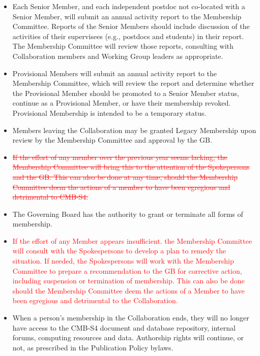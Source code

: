 \documentclass[12pt]{article}
\begin{document}
\begin{itemize} 

\item Each Senior Member, and each independent postdoc not co-located with a Senior Member, will submit an annual activity report to the Membership Committee.  Reports of the Senior Members should include discussion of the activities of their supervisees (e.g., postdocs and students) in their report. The Membership Committee will review those reports, consulting with Collaboration members and Working Group leaders as appropriate.

\item Provisional Members will submit an annual activity report to the Membership Committee, which will review the report and determine whether the Provisional Member should be promoted to a Senior Member status, continue as a Provisional Member, or have their membership revoked.  Provisional Membership is intended to be a temporary status.

\item Members leaving the Collaboration may be granted Legacy Membership upon review by the Membership Committee and approval by the GB.

 \item  \textcolor{red} {\sout{If the effort of any member over the previous year seems lacking, the Membership Committee will bring this to the attention of the Spokepersons and the GB.  This can also be done at any time, should the Membership Committee deem the actions of a member to have been egregious and detrimental to CMB-S4.}}

\item The Governing Board has the authority to grant or terminate all forms of membership.


\item \textcolor{red}{If the effort of any Member appears insufficient. the Membership Committee will consult with the Spokespersons to develop a plan to remedy the situation.  If needed, the Spokespersons will work with the Membership Committee to prepare a recommendation to the GB for corrective action, including suspension or termination of membership.   This can also be done should the Membership Committee deem the actions of a Member to have been egregious and detrimental to the Collaboration. }


\item When a person's membership in the Collaboration ends, they will no longer have access to the CMB-S4 document and database repository, internal forums, computing resources and data.  Authorship rights will continue, or not, as prescribed in the Publication Policy bylaws.


\end{itemize}
\end{document}

